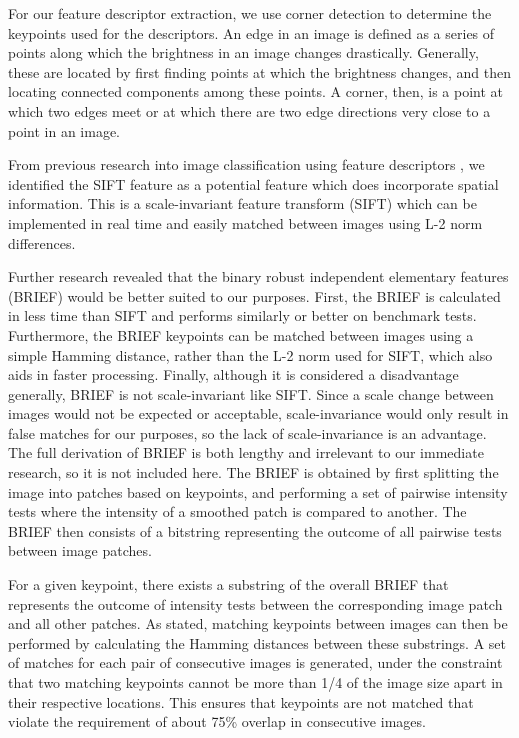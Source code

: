 For our feature descriptor extraction, we use corner detection to determine the keypoints used for the descriptors.
An edge in an image is defined as a series of points along which the brightness in an image changes drastically.
Generally, these are located by first finding points at which the brightness changes, and then locating connected components among these points.
A corner, then, is a point at which two edges meet or at which there are two edge directions very close to a point in an image.


From previous research into image classification using feature descriptors \cite{anomalyhyper}, we identified the SIFT feature as a potential feature which does incorporate spatial information.
This is a scale-invariant feature transform (SIFT) which can be implemented in real time and easily matched between images using L-2 norm differences.


Further research revealed that the binary robust independent elementary features (BRIEF) would be better suited to our purposes.
First, the BRIEF is calculated in less time than SIFT and performs similarly or better on benchmark tests.
Furthermore, the BRIEF keypoints can be matched between images using a simple Hamming distance, rather than the L-2 norm used for SIFT, which also aids in faster processing.
Finally, although it is considered a disadvantage generally, BRIEF is not scale-invariant like SIFT.
Since a scale change between images would not be expected or acceptable, scale-invariance would only result in false matches for our purposes, so the lack of scale-invariance is an advantage.
The full derivation of BRIEF is both lengthy and irrelevant to our immediate research, so it is not included here.
The BRIEF is obtained by first splitting the image into patches based on keypoints, and performing a set of pairwise intensity tests where the intensity of a smoothed patch is compared to another. 
The BRIEF then consists of a bitstring representing the outcome of all pairwise tests between image patches.

For a given keypoint, there exists a substring of the overall BRIEF that represents the outcome of intensity tests between the corresponding image patch and all other patches.
As stated, matching keypoints between images can then be performed by calculating the Hamming distances between these substrings.
A set of matches for each pair of consecutive images is generated, under the constraint that two matching keypoints cannot be more than 1/4 of the image size apart in their respective locations.
This ensures that keypoints are not matched that violate the requirement of about 75\% overlap in consecutive images.

